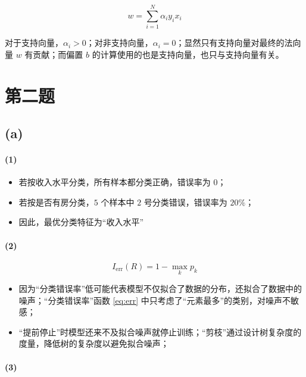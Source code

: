 \documentclass{ctexart}
\begin{document}
\begin{equation*}
w = \sum_{i=1}^N\alpha_iy_ix_i
\end{equation*}


对于支持向量，\(\alpha_i > 0\)；对非支持向量，\(\alpha_i = 0\)；显然只有支持向量对最终的法向量
\(w\) 有贡献；而偏置 \(b\)
的计算使用的也是支持向量，也只与支持向量有关。

\section{第二题}\label{ux7b2cux4e8cux9898}

\subsection{(a)}\label{a-1}

\paragraph{(1)}\label{section-6}

\begin{itemize}

\item
  若按收入水平分类，所有样本都分类正确，错误率为 \(0\)；
\item
  若按是否有房分类，\(5\) 个样本中 \(2\) 号分类错误，错误率为 \(20\%\)；
\item
  因此，最优分类特征为``收入水平''
\end{itemize}

\paragraph{(2)}\label{section-7}


\begin{equation}
I_{\text{err}}(R)=1-\max_{k}p_k \label{eq:err}
\end{equation}


\begin{itemize}

\item
  因为``分类错误率''低可能代表模型不仅拟合了数据的分布，还拟合了数据中的噪声；``分类错误率''函数
  \eqref{eq:err} 中只考虑了``元素最多''的类别，对噪声不敏感；
\item
  ``提前停止''时模型还来不及拟合噪声就停止训练；``剪枝''通过设计树复杂度的度量，降低树的复杂度以避免拟合噪声；
\end{itemize}

\paragraph{(3)}\label{section-8}
\end{document}
